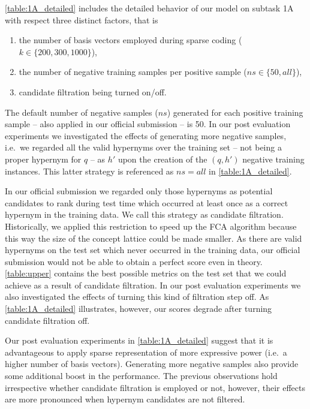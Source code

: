 \documentclass[11pt,a4paper]{article}
\begin{document}
\autoref{table:1A_detailed} includes the detailed behavior of our model on 
subtask 1A with respect three distinct factors, that is
\begin{enumerate}
	\item the number of basis vectors employed during sparse coding ($k \in 
	\{200, 300, 1000\}$),
	\item the number of negative training samples per positive sample ($ns 
	\in \{50, all\}$),
	\item candidate filtration being turned on/off.
\end{enumerate}
The default number of negative samples ($ns$) generated for
each positive training sample -- also applied in our official submission -- is 
50. In our post evaluation experiments we investigated the effects of 
generating more negative samples, i.e.~we regarded all the valid hypernyms over 
the training set -- not being a
proper hypernym for $q$ -- as $h'$ upon the creation of the $(q, h')$ negative 
training instances. This latter strategy is referenced as $ns=all$ in 
\autoref{table:1A_detailed}.

In our official submission we regarded only those hypernyms as potential 
candidates to rank during test time which occurred at least once as a correct 
hypernym in the training data. We call this strategy as candidate filtration. 
Historically, we applied this restriction to speed up the FCA algorithm because 
this way the size of the concept lattice could be made smaller.
As there are valid hypernyms on the test set which never occurred in the 
training data, our official submission would not be able to obtain a perfect 
score even in theory. \autoref{table:upper} contains the best possible metrics 
on the test set that we could achieve as a result of candidate filtration. In 
our post evaluation experiments we also investigated the effects of turning 
this kind of filtration step off. As \autoref{table:1A_detailed} illustrates, 
however, our scores degrade after turning candidate filtration off.



Our post evaluation experiments in \autoref{table:1A_detailed} suggest that it 
is advantageous to apply sparse representation of more expressive power (i.e.~a 
higher number of basis vectors). Generating more negative samples also provide 
some additional boost in the performance. The previous observations hold 
irrespective whether candidate filtration is employed or not, however, their 
effects are more pronounced when hypernym candidates are not filtered.
\end{document}
